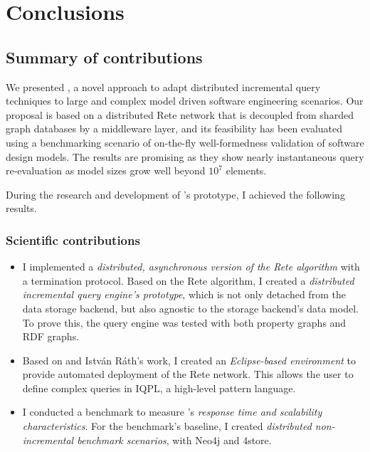 \chapter{Conclusions}
\label{chap:conclusions}

\section{Summary of contributions}


We presented \iqd{}, a novel approach to adapt distributed incremental query techniques to large and complex model driven software engineering scenarios. Our proposal is based on a distributed Rete network that is decoupled from sharded graph databases by a middleware layer, and its feasibility has been evaluated using a benchmarking scenario of on-the-fly well-formedness validation of software design models. The results are promising as they show nearly instantaneous query re-evaluation as model sizes grow well beyond $10^7$ elements.



During the research and development of \iqd{}'s prototype, I achieved the following results.

\subsection{Scientific contributions}

\begin{itemize}
  \item I implemented a \emph{distributed, asynchronous version of the Rete algorithm} with a termination protocol. Based on the Rete algorithm, I created a \emph{distributed incremental query engine's prototype}, which is not only detached from the data storage backend, but also agnostic to the storage backend's data model. To prove this, the query engine was tested with both property graphs and RDF graphs. 
  \item Based on \eiq{} and István Ráth's work, I created an \emph{Eclipse-based environment} to provide automated deployment of the Rete network. This allows the user to define complex queries in IQPL, a high-level pattern language. %
  \item I conducted a benchmark to measure \iqd{}'s \emph{response time and scalability characteristics}. For the benchmark's baseline, I created \emph{distributed non-incremental benchmark scenarios}, with Neo4j and 4store. 
\end{itemize}

